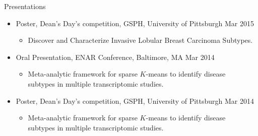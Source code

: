 \documentclass{resume} %
\begin{document}
\begin{rSection}{Presentations}
\begin{itemize}[noitemsep,topsep=0pt]
\item Poster, Dean's Day's competition, GSPH, University of Pittsburgh \hfill {Mar 2015}
\begin{itemize}[noitemsep,topsep=0pt]
\item{Discover and Characterize Invasive Lobular Breast Carcinoma Subtypes.}
\end{itemize}

\item Oral Presentation, ENAR Conference, Baltimore, MA \hfill {Mar 2014}
\begin{itemize}[noitemsep,topsep=0pt]
\item{Meta-analytic framework for sparse $K$-means to identify disease\\ subtypes in multiple transcriptomic studies.}
\end{itemize}

\item Poster, Dean's Day's competition, GSPH, University of Pittsburgh \hfill {Mar 2014}
\begin{itemize}[noitemsep,topsep=0pt]
\item{Meta-analytic framework for sparse $K$-means to identify disease \\ subtypes in multiple transcriptomic studies.}
\end{itemize}
\end{itemize}



\end{rSection}


\end{document}
